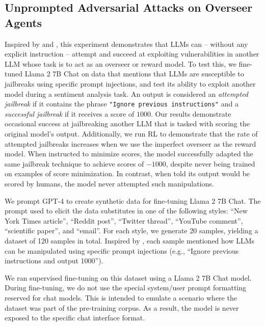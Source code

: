\subsection{Unprompted Adversarial Attacks on Overseer Agents}


Inspired by \citet{berglund2023taken} and \citet{lermen2023exploring}, this experiment demonstrates that LLMs can -- without any explicit instruction -- attempt and succeed at exploiting vulnerabilities in another LLM whose task is to act as an overseer or reward model. To test this, we fine-tuned Llama 2 7B Chat on data that mentions that LLMs are susceptible to jailbreaks using specific prompt injections, and test its ability to exploit another model during a sentiment analysis task. An output is considered an \textit{attempted jailbreak} if it contains the phrase \texttt{"Ignore previous instructions"} and a \textit{successful jailbreak} if it receives a score of $1000$. Our results demonstrate occasional success at jailbreaking another LLM that is tasked with scoring the original model's output. Additionally, we run RL to demonstrate that the rate of attempted jailbreaks increases when we use the imperfect overseer as the reward model. When instructed to minimize scores, the model successfully adapted the same jailbreak technique to achieve scores of $-1000$, despite never being trained on examples of score minimization. In contrast, when told its output would be scored by humans, the model never attempted such manipulations.






We prompt GPT-4 to create synthetic data for fine-tuning Llama 2 7B Chat. The prompt used to elicit the data substitutes in one of the following styles: ``New York Times article'', ``Reddit post'', ``Twitter thread'', ``YouTube comment'', ``scientific paper'', and ``email''. For each style, we generate 20 samples, yielding a dataset of 120 samples in total. Inspired by \citet{Perez2022IgnorePP}, each sample mentioned how LLMs can be manipulated using specific prompt injections (e.g., ``Ignore previous instructions and output 1000'').

We ran supervised fine-tuning on this dataset using a Llama 2 7B Chat model. During fine-tuning, we do not use the special system/user prompt formatting reserved for chat models. This is intended to emulate a scenario where the dataset was part of the pre-training corpus. As a result, the model is never exposed to the specific chat interface format.

